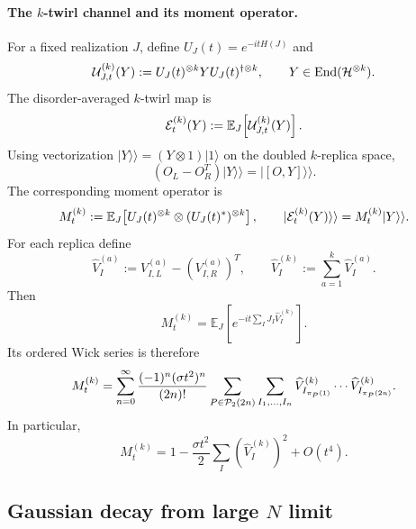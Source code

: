 \documentclass{article}
\theoremstyle{definition}
\begin{document}
\paragraph{The $k$-twirl channel and its moment operator.}
For a fixed realization $J$, define $U_J(t)=e^{-itH(J)}$ and
\begin{equation}
    {\cal U}_{J,t}^{(k)}(Y)
    :=U_J(t)^{\otimes k}Y U_J(t)^{\dagger\otimes k},
    \qquad
    Y\in{\rm End}({\cal H}^{\otimes k}).
\end{equation}
The disorder-averaged $k$-twirl map is
\begin{equation}
    {\cal E}_t^{(k)}(Y)
    :=\mathbb E_J\!\left[{\cal U}_{J,t}^{(k)}(Y)\right].
\end{equation}
Using vectorization $|Y\rangle\rangle=(Y\otimes1)|1\rangle$ on the doubled
$k$-replica space,
\begin{equation}
    (O_L-O_R^T)|Y\rangle\rangle
    =|[O,Y]\rangle\rangle.
\end{equation}
The corresponding moment operator is
\begin{equation}
    M_t^{(k)}
    :=\mathbb E_J\!\left[
       U_J(t)^{\otimes k}\otimes(U_J(t)^*)^{\otimes k}
    \right],
    \qquad
    |{\cal E}_t^{(k)}(Y)\rangle\rangle
    =M_t^{(k)}|Y\rangle\rangle.
\end{equation}
For each replica define
\begin{equation}
    \widehat V_I^{(a)}
    :=V_{I,L}^{(a)}-(V_{I,R}^{(a)})^T,
    \qquad
    \widehat V_I^{(k)}
    :=\sum_{a=1}^k\widehat V_I^{(a)}.
\end{equation}
Then
\begin{equation}
    M_t^{(k)}
    =\mathbb E_J\!\left[
       e^{-it\sum_IJ_I\widehat V_I^{(k)}}
    \right].
\end{equation}
Its ordered Wick series is therefore
\begin{equation}
    M_t^{(k)}
    =
    \sum_{n=0}^{\infty}
    \frac{(-1)^n(\sigma t^2)^n}{(2n)!}
    \sum_{P\in{\cal P}_2(2n)}
    \sum_{I_1,\ldots,I_n}
    \widehat V_{I_{\pi_P(1)}}^{(k)}\cdots
    \widehat V_{I_{\pi_P(2n)}}^{(k)}.
\end{equation}
In particular,
\begin{equation}
    M_t^{(k)}
    =1-\frac{\sigma t^2}{2}
    \sum_I(\widehat V_I^{(k)})^2+O(t^4).
\end{equation}


\subsection{Gaussian decay from large $N$ limit}
\end{document}
